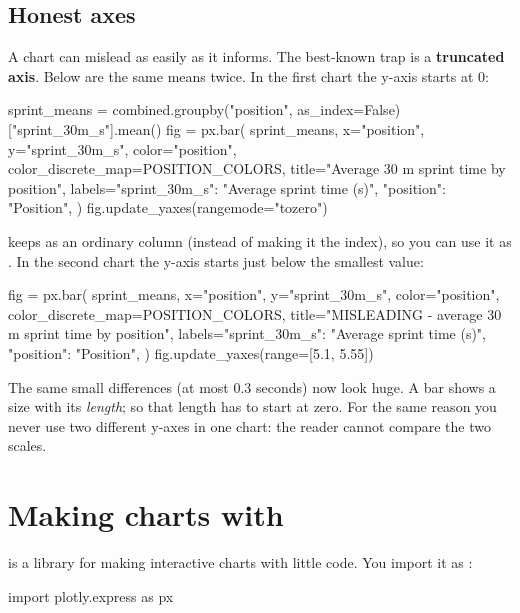 \documentclass[11pt,a4paper]{article}
\begin{document}
\subsection{Honest axes}

A chart can mislead as easily as it informs. The best-known trap is a
\textbf{truncated axis}. Below are the same means twice. In the first
chart the y-axis starts at 0:

\begin{python}[fig=honest]
sprint_means = combined.groupby("position", as_index=False)["sprint_30m_s"].mean()
fig = px.bar(
    sprint_means, x="position", y="sprint_30m_s",
    color="position", color_discrete_map=POSITION_COLORS,
    title="Average 30 m sprint time by position",
    labels={"sprint_30m_s": "Average sprint time (s)", "position": "Position"},
)
fig.update_yaxes(rangemode="tozero")
\end{python}

 keeps  as an ordinary column
(instead of making it the index), so you can use it as . In the
second chart the y-axis starts just below the smallest value:

\begin{python}[fig=misleading]
fig = px.bar(
    sprint_means, x="position", y="sprint_30m_s",
    color="position", color_discrete_map=POSITION_COLORS,
    title="MISLEADING - average 30 m sprint time by position",
    labels={"sprint_30m_s": "Average sprint time (s)", "position": "Position"},
)
fig.update_yaxes(range=[5.1, 5.55])
\end{python}

The same small differences (at most 0.3 seconds) now look huge. A bar
shows a size with its \emph{length}; so that length has to start at
zero. For the same reason you never use two different y-axes in one
chart: the reader cannot compare the two scales.

\section{Making charts with }

 is a library for making interactive charts with
little code. You import it as :

\begin{python}[noout]
import plotly.express as px
\end{python}
\end{document}
